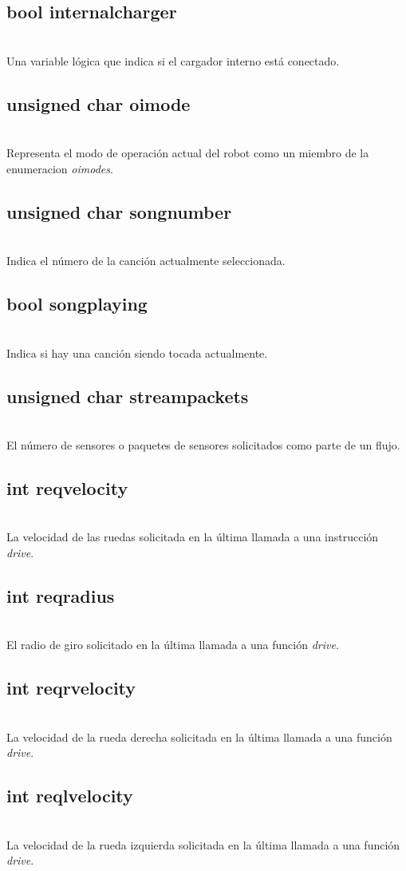 \documentclass[letterpaper]{book}
\begin{document}
\subsection{bool internalcharger}\mbox{}\\
Una variable lógica que indica si el cargador interno está conectado.
\subsection{unsigned char oimode}\mbox{}\\
Representa el modo de operación actual del robot como un miembro de la enumeracion \emph{oimodes}.
\subsection{unsigned char songnumber}\mbox{}\\
Indica el número de la canción actualmente seleccionada.
\subsection{bool songplaying}\mbox{}\\
Indica si hay una canción siendo tocada actualmente.
\subsection{unsigned char streampackets}\mbox{}\\
El número de sensores o paquetes de sensores solicitados como parte de un flujo.
\subsection{int reqvelocity}\mbox{}\\
La velocidad de las ruedas solicitada en la última llamada a una instrucción \emph{drive}.
\subsection{int reqradius}\mbox{}\\
El radio de giro solicitado en la última llamada a una función \emph{drive}.
\subsection{int reqrvelocity}\mbox{}\\
La velocidad de la rueda derecha solicitada en la última llamada a una función \emph{drive}.
\subsection{int reqlvelocity}\mbox{}\\
La velocidad de la rueda izquierda solicitada en la última llamada a una función \emph{drive}.
\end{document}
